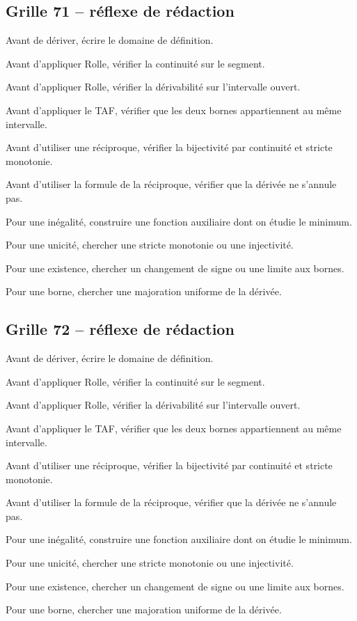 \documentclass[11pt,a4paper]{article}
\begin{document}
\subsection*{Grille 71 -- réflexe de rédaction}

\begin{methodebox}

Avant de dériver, écrire le domaine de définition.

Avant d'appliquer Rolle, vérifier la continuité sur le segment.

Avant d'appliquer Rolle, vérifier la dérivabilité sur l'intervalle ouvert.

Avant d'appliquer le TAF, vérifier que les deux bornes appartiennent au même intervalle.

Avant d'utiliser une réciproque, vérifier la bijectivité par continuité et stricte monotonie.

Avant d'utiliser la formule de la réciproque, vérifier que la dérivée ne s'annule pas.

Pour une inégalité, construire une fonction auxiliaire dont on étudie le minimum.

Pour une unicité, chercher une stricte monotonie ou une injectivité.

Pour une existence, chercher un changement de signe ou une limite aux bornes.

Pour une borne, chercher une majoration uniforme de la dérivée.

\end{methodebox}

\subsection*{Grille 72 -- réflexe de rédaction}

\begin{methodebox}

Avant de dériver, écrire le domaine de définition.

Avant d'appliquer Rolle, vérifier la continuité sur le segment.

Avant d'appliquer Rolle, vérifier la dérivabilité sur l'intervalle ouvert.

Avant d'appliquer le TAF, vérifier que les deux bornes appartiennent au même intervalle.

Avant d'utiliser une réciproque, vérifier la bijectivité par continuité et stricte monotonie.

Avant d'utiliser la formule de la réciproque, vérifier que la dérivée ne s'annule pas.

Pour une inégalité, construire une fonction auxiliaire dont on étudie le minimum.

Pour une unicité, chercher une stricte monotonie ou une injectivité.

Pour une existence, chercher un changement de signe ou une limite aux bornes.

Pour une borne, chercher une majoration uniforme de la dérivée.

\end{methodebox}
\end{document}
